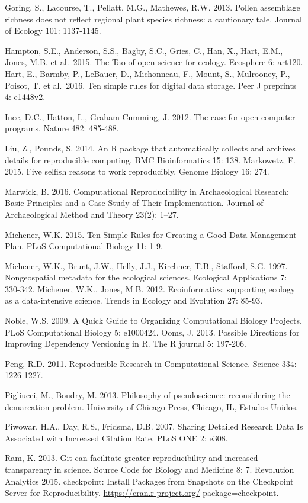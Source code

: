 \documentclass[]{tufte-handout}
\begin{document}
Goring, S., Lacourse, T., Pellatt, M.G., Mathewes, R.W. 2013. Pollen
assemblage richness does not reflect regional plant species richness: a
cautionary tale. Journal of Ecology 101: 1137-1145.

Hampton, S.E., Anderson, S.S., Bagby, S.C., Gries, C., Han, X., Hart,
E.M., Jones, M.B. et al.~2015. The Tao of open science for ecology.
Ecosphere 6: art120. Hart, E., Barmby, P., LeBauer, D., Michonneau, F.,
Mount, S., Mulrooney, P., Poisot, T. et al.~2016. Ten simple rules for
digital data storage. Peer J preprints 4: e1448v2.

Ince, D.C., Hatton, L., Graham-Cumming, J. 2012. The case for open
computer programs. Nature 482: 485-488.

Liu, Z., Pounds, S. 2014. An R package that automatically collects and
archives details for reproducible computing. BMC Bioinformatics 15: 138.
Markowetz, F. 2015. Five selfish reasons to work reproducibly. Genome
Biology 16: 274.

Marwick, B. 2016. Computational Reproducibility in Archaeological
Research: Basic Principles and a Case Study of Their Implementation.
Journal of Archaeological Method and Theory 23(2): 1--27.

Michener, W.K. 2015. Ten Simple Rules for Creating a Good Data
Management Plan. PLoS Computational Biology 11: 1-9.

Michener, W.K., Brunt, J.W., Helly, J.J., Kirchner, T.B., Stafford, S.G.
1997. Nongeospatial metadata for the ecological sciences. Ecological
Applications 7: 330-342. Michener, W.K., Jones, M.B. 2012.
Ecoinformatics: supporting ecology as a data-intensive science. Trends
in Ecology and Evolution 27: 85-93.

Noble, W.S. 2009. A Quick Guide to Organizing Computational Biology
Projects. PLoS Computational Biology 5: e1000424. Ooms, J. 2013.
Possible Directions for Improving Dependency Versioning in R. The R
journal 5: 197-206.

Peng, R.D. 2011. Reproducible Research in Computational Science. Science
334: 1226-1227.

Pigliucci, M., Boudry, M. 2013. Philosophy of pseudoscience:
reconsidering the demarcation problem. University of Chicago Press,
Chicago, IL, Estados Unidos.

Piwowar, H.A., Day, R.S., Fridsma, D.B. 2007. Sharing Detailed Research
Data Is Associated with Increased Citation Rate. PLoS ONE 2: e308.

Ram, K. 2013. Git can facilitate greater reproducibility and increased
transparency in science. Source Code for Biology and Medicine 8: 7.
Revolution Analytics 2015. checkpoint: Install Packages from Snapshots
on the Checkpoint Server for Reproducibility.
\url{https://cran.r-project.org/} package=checkpoint.
\end{document}
